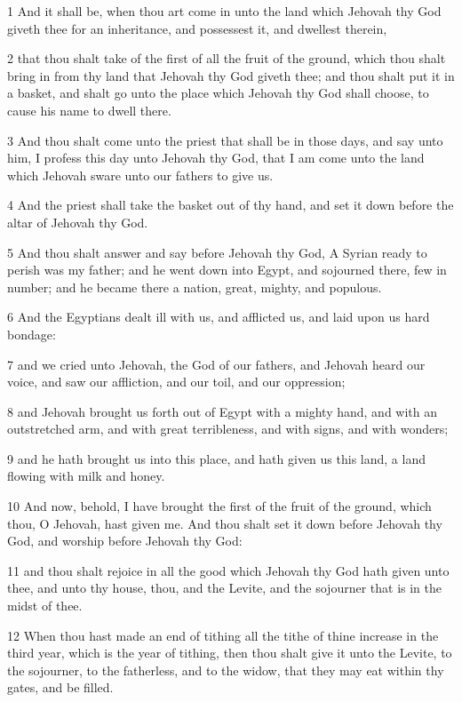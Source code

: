 \par 1 And it shall be, when thou art come in unto the land which Jehovah thy God giveth thee for an inheritance, and possessest it, and dwellest therein,
\par 2 that thou shalt take of the first of all the fruit of the ground, which thou shalt bring in from thy land that Jehovah thy God giveth thee; and thou shalt put it in a basket, and shalt go unto the place which Jehovah thy God shall choose, to cause his name to dwell there.
\par 3 And thou shalt come unto the priest that shall be in those days, and say unto him, I profess this day unto Jehovah thy God, that I am come unto the land which Jehovah sware unto our fathers to give us.
\par 4 And the priest shall take the basket out of thy hand, and set it down before the altar of Jehovah thy God.
\par 5 And thou shalt answer and say before Jehovah thy God, A Syrian ready to perish was my father; and he went down into Egypt, and sojourned there, few in number; and he became there a nation, great, mighty, and populous.
\par 6 And the Egyptians dealt ill with us, and afflicted us, and laid upon us hard bondage:
\par 7 and we cried unto Jehovah, the God of our fathers, and Jehovah heard our voice, and saw our affliction, and our toil, and our oppression;
\par 8 and Jehovah brought us forth out of Egypt with a mighty hand, and with an outstretched arm, and with great terribleness, and with signs, and with wonders;
\par 9 and he hath brought us into this place, and hath given us this land, a land flowing with milk and honey.
\par 10 And now, behold, I have brought the first of the fruit of the ground, which thou, O Jehovah, hast given me. And thou shalt set it down before Jehovah thy God, and worship before Jehovah thy God:
\par 11 and thou shalt rejoice in all the good which Jehovah thy God hath given unto thee, and unto thy house, thou, and the Levite, and the sojourner that is in the midst of thee.
\par 12 When thou hast made an end of tithing all the tithe of thine increase in the third year, which is the year of tithing, then thou shalt give it unto the Levite, to the sojourner, to the fatherless, and to the widow, that they may eat within thy gates, and be filled.
